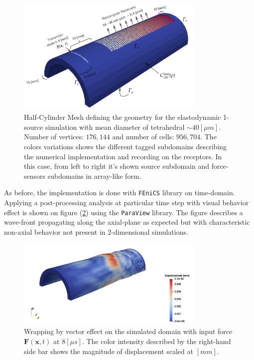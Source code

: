 \begin{figure}[!h]
	\centering
	\includegraphics[width=0.8\textwidth]{images/ImgExt/HalfCyl3d-MeshBoundaries.png}
	\caption{Half-Cylinder Mesh defining the geometry for the elastodynamic 1-source simulation with mean diameter of tetrahedral $\sim 40 [\mu m]$. Number of vertices: $176,144$ and number of cells: $956,704$. The colors variations shows the different tagged subdomains describing the numerical implementation and recording on the receptors. In this case, from left to right it's shown source subdomain and force-sensors subdomains in array-like form. }
	\label{HalfCylSubdomainsFile}
\end{figure} 

As before, the implementation is done with \texttt{FEniCS} library on time-domain. Applying a post-processing analysis at particular time step with visual behavior effect is shown on figure (\ref{HalfCyl-TimeStep}) using the \texttt{ParaView} library. The figure describes a wave-front propagating along the axial-plane as expected but with characteristic non-axial behavior not present in 2-dimensional simulations.

\begin{figure}[!h]
	\centering
	\includegraphics[width=0.8\textwidth]{images/ImgExt/HalfCyl3d-T160.png}
	\caption{Wrapping by vector effect on the simulated domain with input force $\mathbf{F}(\mathbf{x},t)$ at $8 [\mu s]$. The color intensity described by the right-hand side bar shows the magnitude of displacement scaled at $[mm]$. }
	\label{HalfCyl-TimeStep}
\end{figure} 


